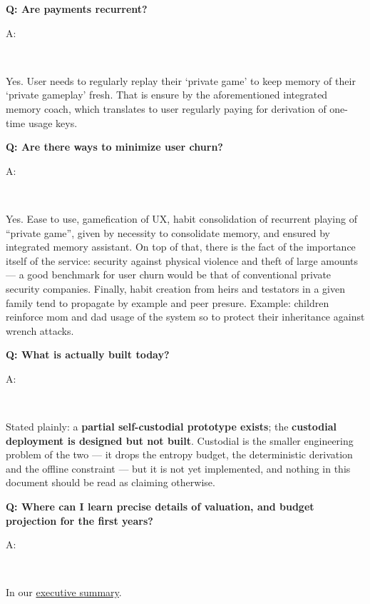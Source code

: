 \documentclass[12pt,a4paper]{article}
\newenvironment{question}[1]{%
  \vspace{0.8em}\noindent\textbf{Q: #1}\par
  \vspace{0.2em}\noindent\begin{itshape}A:\end{itshape}~%
}{\vspace{0.8em}}
\begin{document}
\begin{question}{Are payments recurrent?}
Yes. User needs to regularly replay their `private game' to keep memory of their `private gameplay' fresh. That is ensure by the aforementioned integrated memory coach, which translates to user regularly paying for derivation of one-time usage keys.
\end{question}

\begin{question}{Are there ways to minimize user churn?}
Yes. Ease to use, gamefication of UX, habit consolidation of recurrent playing of ``private game'', given by necessity to consolidate memory, and ensured by integrated memory assistant. On top of that, there is the fact of the importance itself of the service: security against physical violence and theft of large amounts --- a good benchmark for user churn would be that of conventional private security companies. Finally, habit creation from heirs and testators in a given family tend to propagate by example and peer presure. Example: children reinforce mom and dad usage of the system so to protect their inheritance against wrench attacks.
\end{question}

\begin{question}{What is actually built today?}
Stated plainly: a \textbf{partial self-custodial prototype exists}; the \textbf{custodial deployment is designed but not built}. Custodial is the smaller engineering problem of the two --- it drops the entropy budget, the deterministic derivation and the offline constraint --- but it is not yet implemented, and nothing in this document should be read as claiming otherwise.
\end{question}

\begin{question}{Where can I learn precise details of valuation, and budget projection for the first years?}
In our \href{https://loudproudandfree.com}{executive summary}.
\end{question}
\end{document}
